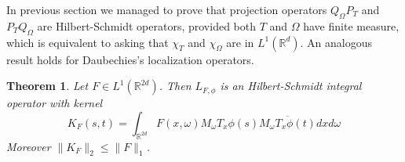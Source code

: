 \documentclass[corpo=11pt, stile=classica, tipotesi=custom,
greek, evenboxes, english]{toptesi}
\numberwithin{equation}{chapter}
\newtheorem{teo}{Theorem}[chapter] %
\theoremstyle{remark}
\newcommand{\R}{\mathbb{R}} %
\begin{document}
In previous section we managed to prove that projection operators $Q_{\Omega}P_T$ and $P_T Q_{\Omega}$ are Hilbert-Schmidt operators, provided both $T$ and $\Omega$ have finite measure, which is equivalent to asking that $\chi_T$ and $\chi_{\Omega}$ are in $L^1(\R^d)$. An analogous result holds for Daubechies's localization operators.
\begin{teo}\label{F integrable L_F Hilbert-Schmidt}
	Let $F \in L^1(\R^{2d})$. Then $L_{F,\phi}$ is an Hilbert-Schmidt integral operator with kernel
	\begin{equation}\label{integral kernel localization operator}
		K_F(s,t) = \int_{\R^{2d}} F(x,\omega) M_{\omega} T_x \phi(s) \overline{M_{\omega} T_x \phi(t)} dx d\omega
	\end{equation}
	{\color{blue} Moreover $\|K_F\|_2 \leq \|F\|_1$.}
\end{teo}
\end{document}
